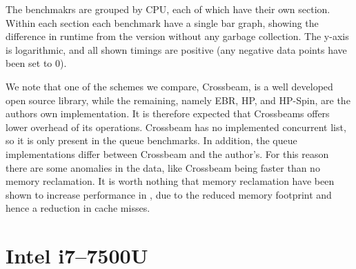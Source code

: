 \documentclass[b5paper]{report}
\begin{document}
The benchmakrs are grouped by CPU, each of which have their own section.  Within
each section each benchmark have a single bar graph, showing the difference in
runtime from the version without any garbage collection. The y-axis is
logarithmic, and all shown timings are positive (any negative data points have
been set to 0).

We note that one of the schemes we compare, Crossbeam, is a well developed open
source library, while the remaining, namely EBR, HP, and HP-Spin, are the
authors own implementation. It is therefore expected that Crossbeams offers
lower overhead of its operations. Crossbeam has no implemented concurrent list,
so it is only present in the queue benchmarks.  In addition, the queue
implementations differ between Crossbeam and the author's. For this reason there
are some anomalies in the data, like Crossbeam being faster than no memory
reclamation. It is worth nothing that memory reclamation have been shown to
increase performance in \cite{brown2015reclaiming}, due to the reduced memory
footprint and hence a reduction in cache misses.

\newcommand{\benches}[2]{
  \begin{figure}[ht]
    \centering
    \begin{subfigure}{0.40\textwidth}
      \centering \footnotesize\code{Queue::Pop}
      \texttt{[image: plots/\#1-b:queue\_pop.pdf]}
    \end{subfigure}
    \begin{subfigure}{0.40\textwidth}
      \centering \footnotesize\code{Queue::Transfer}
      \texttt{[image: plots/\#1-b:queue\_transfer.pdf]}
    \end{subfigure}
    \\\vspace{0.25cm}
    \begin{subfigure}{0.40\textwidth}
      \centering \footnotesize\code{List::Remove}
      \texttt{[image: plots/\#1-b:list\_remove.pdf]}
    \end{subfigure}
    \begin{subfigure}{0.40\textwidth}
      \centering \footnotesize\code{List::Real}
      \texttt{[image: plots/\#1-b:list\_real.pdf]}
    \end{subfigure}
    \caption{Benchmarks relative to no memory reclamation for the #2}
  \end{figure}
}

\clearpage
\section{Intel\textregistered{} i7--7500U}
\end{document}
